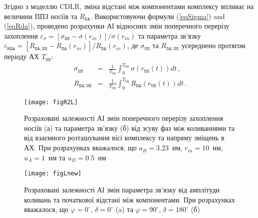 Згідно з моделлю CDLR, зміна відстані між компонентами комплексу впливає на величини
ППЗ носіїв та $R_\mathtt{DA}$.
Використовуючи формули (\ref{eqSigma}) and (\ref{eqRda}), проведено розрахунки
АІ відносних змін поперечного перерізу захоплення
$\varepsilon_\sigma=[\sigma_{\mathtt{US}}-\sigma(r_{in})]/\sigma(r_{in})$
та параметра зв'язку
$\varepsilon_{\mathtt{RDA}}=[R_{\mathtt{DA,US}}-R_\mathtt{DA}(r_{in})]/R_\mathtt{DA}(r_{in})$,
де $\sigma_{\mathtt{US}}$ та $R_{\mathtt{DA,US}}$ усереднено протягом періоду АХ $T_\mathtt{US}$:
\begin{eqnarray}
  \label{eqAverSigma} \sigma_{\mathtt{US}}&=&\frac{1}{T_\mathtt{US}}\int^{T_\mathtt{US}}_0\!\!\!\!\!\!\sigma(r_\mathtt{US}(t))dt\,, \\
  \label{eqAverRda} R_{\mathtt{DA,US}}&=&\frac{1}{T_\mathtt{US}}\int^{T_\mathtt{US}}_0\!\!\!\!\!\!R_{\mathtt{DA}}(r_\mathtt{US}(t))dt\,.
\end{eqnarray}



\begin{figure}
\center
\texttt{[image: figR2L]}
\caption{\label{figR2L}
Розраховані залежності  АІ змін поперечного перерізу захоплення носіїв (а) та параметра зв'язку (б) від зсуву фаз між коливаннями та від взаємного
розташування вісі комплексу та напряму зміщень в АХ.
При розрахунках вважалося, що $a_B=3.23$~нм, $r_{in}=10$~нм, $u_A=1$~нм та $u_D=0.5$~нм
}%
\end{figure}

\begin{figure}
\center
\texttt{[image: figLnew]}
\caption{\label{figLnew}
Розраховані залежності  АІ змін параметра зв'язку від амплітуди коливань та початкової відстані між компонентами.
При розрахунках вважалося, що $\varphi=0^\circ$, $\delta=0^\circ$ (a) та $\varphi=90^\circ$, $\delta=180^\circ$ (б)
}%
\end{figure}

